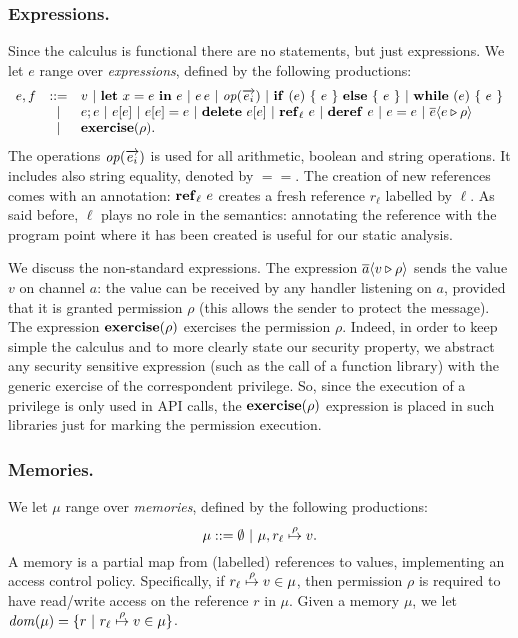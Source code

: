\subsubsection{Expressions.} 
Since the calculus is functional there are no statements, but just expressions.
We let $e$ range over \emph{expressions}, defined by the following productions:
\[
\begin{array}{lcl}
e,f & ::= & v ~|~ \mathbf{let}\ x = e\ \mathbf{in}\ e ~|~ e\, e ~|~ \mathit{op}(\overrightarrow{e_i}) ~|~ \mathbf{if}\ (e)\ \{\ e\ \}\ \mathbf{else}\ \{\ e\ \} ~|~ \mathbf{while}\ (e)\ \{\ e\ \} \\
& | & e;e ~|~ e[e] ~|~ e[e] = e ~|~ \mathbf{delete}\ e[e] ~|~ \mathbf{ref}_{\ell}\ e ~|~ \mathbf{deref}\ e ~|~ e = e ~|~ \overline{e} \langle e \triangleright \rho \rangle \\
& | & \mathbf{exercise}(\rho).
\end{array}
\]
The operations $\mathit{op}(\overrightarrow{e_i})$ is used for all arithmetic, boolean and string operations. It includes also string equality, denoted by $==$. The creation of new references comes with an annotation:
$\mathbf{ref}_{\ell}\ e$ creates a fresh reference $r_\ell$ labelled by $\ell$.
As said before, $\ell$ plays no role in the semantics: annotating the reference
with the program point where it has been created is useful for our
static analysis.

We discuss the non-standard expressions. The expression
$\overline{a} \langle v \triangleright \rho \rangle$ sends the value $v$ on channel $a$: the value can
be received by any handler listening on $a$, provided that it is
granted permission $\rho$ (this allows the sender to protect the
message). The expression $\mathbf{exercise}(\rho)$ exercises the permission
$\rho$. Indeed, in order to keep simple the calculus and to more
clearly state our security property, we abstract any
security sensitive expression (such as the call of a function library)
with the generic exercise of the correspondent privilege. So, since the execution of a privilege is only used in API calls, the $\mathbf{exercise}(\rho)$ expression is placed in such libraries just for marking the permission execution.

\subsubsection{Memories.}
We let $\mu$ range over \emph{memories}, defined by the following productions:
\[
\mu ::= \emptyset ~|~ \mu, r_{\ell} \stackrel{\rho}{\mapsto} v.
\]
A memory is a partial map from (labelled) references to values, implementing an access control policy. Specifically, if $r_{\ell} \stackrel{\rho}{\mapsto} v \in \mu$, then permission $\rho$ is required to have read/write access on the reference $r$ in $\mu$. Given a memory $\mu$, we let $\mathit{dom}(\mu) = \{r ~|~ r_{\ell} \stackrel{\rho}{\mapsto} v \in \mu\}$.

